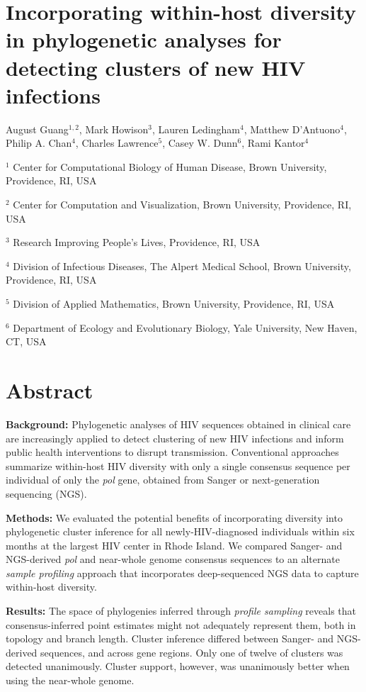 \documentclass[letterpaper]{article}
\begin{document}
\section*{Incorporating within-host diversity in phylogenetic analyses for detecting clusters of new HIV infections}

August Guang$^{1,2}$, Mark Howison$^3$, Lauren Ledingham$^4$, Matthew D'Antuono$^4$, Philip A. Chan$^4$, Charles Lawrence$^5$, Casey W. Dunn$^6$, Rami Kantor$^4$

$^1$ Center for Computational Biology of Human Disease, Brown University, Providence, RI, USA

$^2$ Center for Computation and Visualization, Brown University, Providence, RI, USA

$^3$ Research Improving People's Lives, Providence, RI, USA

$^4$ Division of Infectious Diseases, The Alpert Medical School, Brown University, Providence, RI, USA

$^5$ Division of Applied Mathematics, Brown University, Providence, RI, USA

$^6$ Department of Ecology and Evolutionary Biology, Yale University, New Haven, CT, USA


\doublespace
\section*{Abstract}

\textbf{Background:} Phylogenetic analyses of HIV sequences obtained in clinical care are increasingly applied to detect clustering of new HIV infections and inform public health interventions to disrupt transmission. Conventional approaches summarize within-host HIV diversity with only a single consensus sequence per individual of only the \emph{pol} gene, obtained from Sanger or next-generation sequencing (NGS).

\textbf{Methods:} We evaluated the potential benefits of incorporating diversity into phylogenetic cluster inference for all newly-HIV-diagnosed individuals within six months at the largest HIV center in Rhode Island. We compared Sanger- and NGS-derived \emph{pol} and near-whole genome consensus sequences to an alternate \emph{sample profiling} approach that incorporates deep-sequenced NGS data to capture within-host diversity.

\textbf{Results:} The space of phylogenies inferred through \emph{profile sampling} reveals that consensus-inferred point estimates might not adequately represent them, both in topology and branch length. Cluster inference differed between Sanger- and NGS-derived sequences, and across gene regions. Only one of twelve of clusters was detected unanimously. Cluster support, however, was unanimously better when using the near-whole genome.
\end{document}
